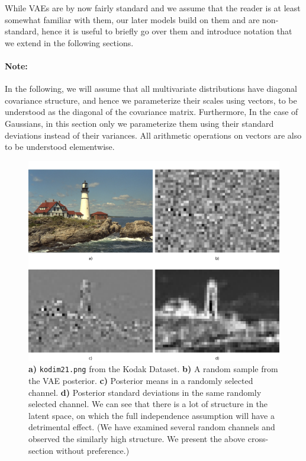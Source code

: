 \par While VAEs are by now fairly standard and we assume that the reader is at
least somewhat familiar with them, our later models build on them and are
non-standard, hence it is useful to briefly go over them and introduce
notation that we extend in the following sections.


\paragraph{Note:} In the following, we will assume that all multivariate
distributions have diagonal covariance structure, and hence we
parameterize their scales using vectors, to be understood as the diagonal of the
covariance matrix. Furthermore, In the case of Gaussians, in this section only
we parameterize them using their standard deviations instead of their variances.
All arithmetic operations on vectors are also to be understood elementwise.

\begin{figure}
  \centering
  \includegraphics[width=\textwidth]{vae_rand_posterior.png}
  \caption[Latent spaces induced by \texttt{kodim21} in our VAE.]
  {\textbf{a)} \texttt{kodim21.png} from the Kodak Dataset. \textbf{b)}
    A random sample from the VAE posterior. \textbf{c)} Posterior means in a
  randomly selected channel. \textbf{d)} Posterior standard deviations in the same
  randomly selected channel. We can see that there is a lot of structure in the
  latent space, on which the full independence assumption will have a detrimental
  effect. (We have examined several random channels and observed the
  similarly high structure. We present the above cross-section without preference.)}
  \label{fig:vae_rand_posterior}
\end{figure}

